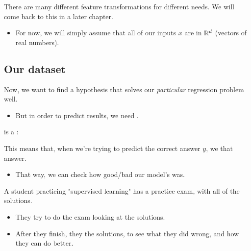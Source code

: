         There are many different feature transformations for different needs. We will come back to this in a later chapter. 

        \begin{itemize}
            \item For now, we will simply assume that all of our inputs $x$ are  in $\mathbb R^d$ (vectors of real numbers).
        \end{itemize}


    \pagebreak
        
        
        
    \subsection{Our dataset}

        Now, we want to find a hypothesis that solves our \textit{particular} regression problem well.

        \begin{itemize}
            \item But in order to predict results, we need .\\
        \end{itemize}

        \begin{concept}
             is a :

            This means that, when we're trying to predict the correct answer $y$, we  that answer.

            \begin{itemize}
                \item That way, we can check how good/bad our model's  was.
            \end{itemize}
        \end{concept}

        \miniex A student practicing "supervised learning" has a practice exam, with all of the solutions.

        \begin{itemize}
            \item They try to do the exam  looking at the solutions.
            \item After they finish, they  the solutions, to see what they did wrong, and how they can do better.
        \end{itemize}

